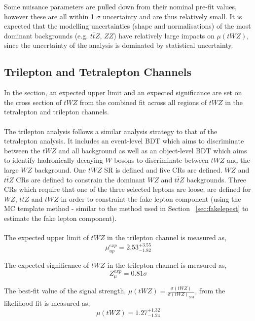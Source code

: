 Some nuisance parameters are pulled down from their nominal pre-fit values, however these are all within 1 $\sigma$ uncertainty and are thus relatively small. It is expected that the modelling uncertainties (shape and normalisations) of the most dominant backgrounds (e.g. $t\bar{t}Z$, $ZZ$) have relatively large impacts on $\mu(tWZ)$, since the uncertainty of the analysis is dominated by statistical uncertainty.

\subsection{Trilepton and Tetralepton Channels}
\label{sec:combined-results}
In the section, an expected upper limit and an expected significance are set on the cross section of $tWZ$ from the combined fit across all regions of $tWZ$ in the tetralepton and trilepton channels.\\\\
The trilepton analysis follows a similar analysis strategy to that of the tetralepton analysis. It includes an event-level BDT which aims to discriminate between the $tWZ$ and all background as well as an object-level BDT which aims to identify hadronically decaying $W$ bosons to discriminate between $tWZ$ and the large $WZ$ background. One $tWZ$ SR is defined and five CRs are defined. $WZ$ and $t\bar{t}Z$ CRs are defined to constrain the dominant $WZ$ and $t\bar{t}Z$ backgrounds. Three CRs which require that one of the three selected leptons are loose, are defined for $WZ$, $t\bar{t}Z$ and $tWZ$ in order to constraint the fake lepton component (using the MC template method - similar to the method used in Section ~\ref{sec:fakelepest} to estimate the fake lepton component).\\\\
The expected upper limit of $tWZ$ in the trilepton channel is measured as,
\begin{equation}
  \mu_{up}^{exp} =   2.53^{+3.55}_{-1.82}
\end{equation}

The expected significance of $tWZ$ in the trilepton channel is measured as,
\begin{equation}
 Z_{\mu}^{exp} =   0.81\sigma
\end{equation}

The best-fit value of the signal strength, $\mu (tWZ)= \frac{\sigma(tWZ)}{\sigma(tWZ)_{SM}}$, from the likelihood fit is measured as,
\begin{equation}
  \mu (tWZ) =   1.27^{+1.32}_{-1.24}
\end{equation}

